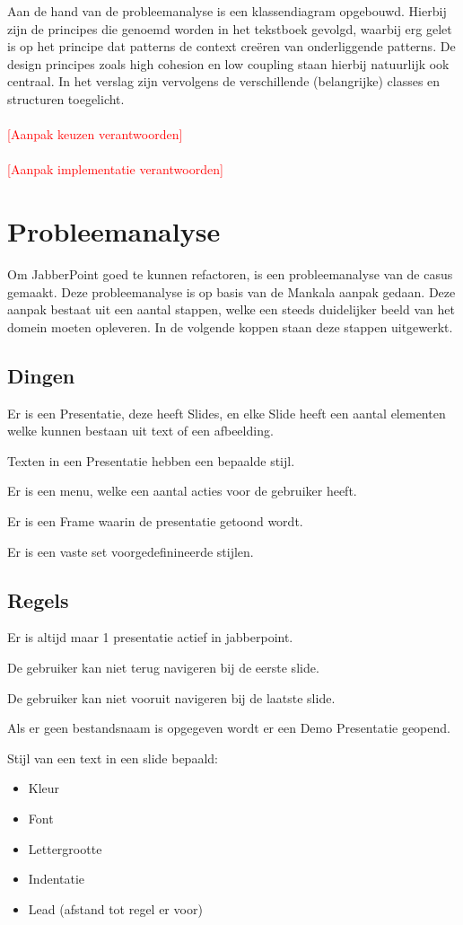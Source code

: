 \documentclass[a4paper]{article}
\newcommand{\todo}[1]{\textcolor{red}{[#1]}}
\begin{document}
Aan de hand van de probleemanalyse is een klassendiagram opgebouwd. Hierbij zijn de principes die genoemd worden in het tekstboek gevolgd, waarbij erg gelet is op het principe dat patterns de context creëren van onderliggende patterns. De design principes zoals high cohesion en low coupling staan hierbij natuurlijk ook centraal. In het verslag zijn vervolgens de verschillende (belangrijke) classes en structuren toegelicht.
\\\\
\todo{Aanpak keuzen verantwoorden}
\\\\
\todo{Aanpak implementatie verantwoorden}


\section{Probleemanalyse}
Om JabberPoint goed te kunnen refactoren, is een probleemanalyse van de casus gemaakt. Deze probleemanalyse is op basis van de Mankala aanpak gedaan. Deze aanpak bestaat uit een aantal stappen, welke een steeds duidelijker beeld van het domein moeten opleveren. In de volgende koppen staan deze stappen uitgewerkt.

\subsection{Dingen}
Er is een Presentatie, deze heeft Slides, en elke Slide heeft een aantal
elementen welke kunnen bestaan uit text of een afbeelding.

Texten in een Presentatie hebben een bepaalde stijl.

Er is een menu, welke een aantal acties voor de gebruiker heeft.

Er is een Frame waarin de presentatie getoond wordt.

Er is een vaste set voorgedefinineerde stijlen.

\subsection{Regels}
Er is altijd maar 1 presentatie actief in jabberpoint.

De gebruiker kan niet terug navigeren bij de eerste slide.

De gebruiker kan niet vooruit navigeren bij de laatste slide.

Als er geen bestandsnaam is opgegeven wordt er een Demo Presentatie geopend.

Stijl van een text in een slide bepaald:
\begin{itemize}
    \item Kleur
    \item Font
    \item Lettergrootte
    \item Indentatie
    \item Lead (afstand tot regel er voor)
\end{itemize}
\end{document}
